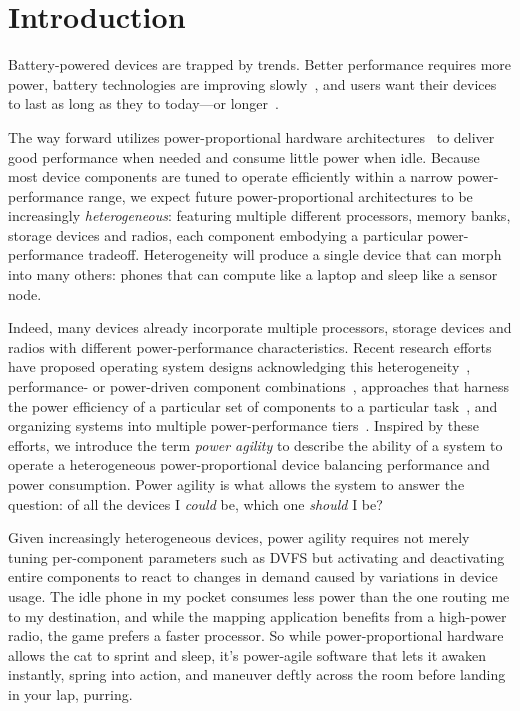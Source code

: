 \section{Introduction}

Battery-powered devices are trapped by trends. Better performance requires
more power, battery technologies are improving
slowly~\cite{economist-batteryhistory}, and users want their devices to last
as long as they to today---or longer~\cite{FIXME}.

The way forward utilizes power-proportional hardware
architectures~\cite{barroso-energyproportional} to deliver good performance
when needed and consume little power when idle. Because most device
components are tuned to operate efficiently within a narrow power-performance
range, we expect future power-proportional architectures to be increasingly
\textit{heterogeneous}: featuring multiple different processors, memory
banks, storage devices and radios, each component embodying a particular
power-performance tradeoff. Heterogeneity will produce a single device that
can morph into many others: phones that can compute like a laptop and sleep
like a sensor node.

Indeed, many devices already incorporate multiple processors, storage devices
and radios with different power-performance characteristics. Recent research
efforts have proposed operating system designs acknowledging this
heterogeneity~\cite{FIXME-Barrelfish}, performance- or power-driven component
combinations~\cite{FIXME-HybridDRAM,FIXME-ArunaWork}, approaches that harness
the power efficiency of a particular set of components to a particular
task~\cite{FIXME-FAWN,FIXME-Amdahl}, and organizing systems into multiple
power-performance tiers~\cite{FIXME-Turducken}. Inspired by these efforts, we
introduce the term \textit{power agility} to describe the ability of a system
to operate a heterogeneous power-proportional device balancing performance
and power consumption. Power agility is what allows the system to answer the
question: of all the devices I \textit{could} be, which one \textit{should} I
be?

Given increasingly heterogeneous devices, power agility requires not merely
tuning per-component parameters such as DVFS but activating and deactivating
entire components to react to changes in demand caused by variations in
device usage. The idle phone in my pocket consumes less power than the one
routing me to my destination, and while the mapping application benefits from
a high-power radio, the game prefers a faster processor. So while
power-proportional hardware allows the cat to sprint and sleep, it's
power-agile software that lets it awaken instantly, spring into action, and
maneuver deftly across the room before landing in your lap, purring.


